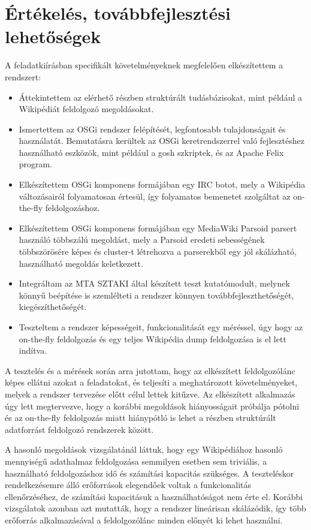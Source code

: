 \chapter{Értékelés, továbbfejlesztési lehetőségek}
\label{cha:ending}

A feladatkiírásban specifikált követelményeknek megfelelően elkészítettem a rendszert:

\begin{itemize}
	\item Áttekintettem az elérhető részben struktúrált tudásbázisokat, mint például a Wikipédiát feldolgozó megoldásokat.
	\item Ismertettem az OSGi rendszer felépítését, legfontosabb tulajdonságait és használatát. Bemutatásra kerültek az OSGi keretrendszerrel való fejlesztéshez használható eszközök, mint például a gosh szkriptek, és az Apache Felix program.
	\item Elkészítettem OSGi komponens formájában egy IRC botot, mely a Wikipédia változásairól folyamatosan értesül, így folyamatos bemenetet szolgáltat az on-the-fly feldolgozáshoz.
	\item Elkészítettem OSGi komponens formájában egy MediaWiki Parsoid parsert használó többszálú megoldást, mely a Parsoid eredeti sebességének többszörösére képes és cluster-t létrehozva a parserekből egy jól skálázható, használható megoldás keletkezett.
	\item Integráltam az MTA SZTAKI által készített teszt kutatómodult, melynek könnyű beépítése is szemlélteti a rendszer könnyen továbbfejleszthetőségét, kiegészíthetőségét.
	\item Teszteltem a rendszer képességeit, funkcionalitását egy méréssel, úgy hogy az on-the-fly feldolgozás és egy teljes Wikipédia dump feldolgozása is el lett indítva.
\end{itemize}

A tesztelés és a mérések során arra jutottam, hogy az elkészített feldolgozólánc képes ellátni azokat a feladatokat, és teljesíti a meghatározott követelményeket, melyek a rendszer tervezése előtt célul lettek kitűzve. Az elkészített alkalmazás úgy lett megtervezve, hogy a korábbi megoldások hiányosságait próbálja pótolni és az on-the-fly feldolgozás miatt hiánypótló is lehet a részben struktúrált adatforrást feldolgozó rendszerek között.

A hasonló megoldások vizsgálatánál láttuk, hogy egy Wikipédiához hasonló mennyiségű adathalmaz feldolgozása semmilyen esetben sem triviális, a használható feldolgozáshoz idő és számítási kapacitás szükséges. A teszteléskor rendelkezésemre álló erőforrások elegendőek voltak a funkcionalitás ellenőrzéséhez, de számítási kapacitásuk a használhatóságot nem érte el. Korábbi vizsgálatok azonban azt mutatták, hogy a rendszer lineárisan skálázódik, így több erőforrás alkalmazásával a feldolgozólánc minden előnyét ki lehet használni.

